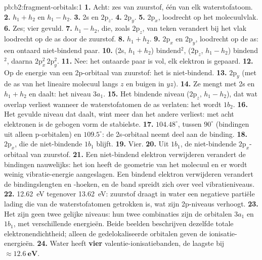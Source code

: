 \begin{solution}{pb:b2:fragment-orbitals:1}
\textbf{1.} Acht: zes van zuurstof, één van elk waterstofatoom.
\textbf{2.} $h_1 + h_2$ en $h_1 - h_2$.
\textbf{3.} 2s en $2\mathrm p_z$.
\textbf{4.} $2\mathrm p_y$.
\textbf{5.} $2\mathrm p_x$, loodrecht op het molecuulvlak.
\textbf{6.} Zes; vier gevuld.
\textbf{7.} $h_1 - h_2$, die, zoals $2\mathrm p_z$, van teken verandert bij het vlak
loodrecht op de as door de zuurstof.
\textbf{8.} $h_1 + h_2$.
\textbf{9.} $2\mathrm p_x$ en $2\mathrm p_y$, loodrecht op de as: een ontaard
niet-bindend paar.
\textbf{10.} (2s, $h_1 + h_2$) bindend$^2$, ($2\mathrm p_z$, $h_1 - h_2$) bindend$^2$, daarna
$2\mathrm p_x^2\,2\mathrm p_y^2$.
\textbf{11.} Nee: het ontaarde paar is vol, elk elektron is gepaard.
\textbf{12.} Op de energie van een 2p-orbitaal van zuurstof: het is niet-bindend.
\textbf{13.} $2\mathrm p_y$ (met de as van het lineaire molecuul langs $z$ en buigen in $yz$).
\textbf{14.} Ze mengt met 2s en $h_1 + h_2$ en daalt: het niveau $3a_1$.
\textbf{15.} Het bindende niveau ($2\mathrm p_z$, $h_1 - h_2$), dat wat overlap verliest wanneer de
waterstofatomen de as verlaten: het wordt $1b_2$.
\textbf{16.} Het gevulde niveau dat daalt, wint meer dan het andere verliest: met acht
elektronen is de gebogen vorm de stabielste.
\textbf{17.} $104.48^\circ$, tussen $90^\circ$ (bindingen uit alleen p-orbitalen) en $109.5^\circ$:
de 2s-orbitaal neemt deel aan de binding.
\textbf{18.} $2\mathrm p_x$, die de niet-bindende $1b_1$ blijft.
\textbf{19.} Vier.
\textbf{20.} Uit $1b_1$, de niet-bindende $2\mathrm p_x$-orbitaal van zuurstof.
\textbf{21.} Een niet-bindend elektron verwijderen verandert de bindingen nauwelijks: het ion heeft de
geometrie van het molecuul en er wordt weinig vibratie-energie aangeslagen. Een
bindend elektron verwijderen verandert de bindingslengten en -hoeken, en de band spreidt zich over
veel vibratieniveaus.
\textbf{22.} \qty{12.62}{eV} tegenover \qty{13.62}{eV}: zuurstof draagt in water een negatieve
partiële lading die van de waterstofatomen getrokken is, wat zijn 2p-niveaus verhoogt.
\textbf{23.} Het zijn geen twee gelijke niveaus: hun twee combinaties zijn de orbitalen $3a_1$ en
$1b_1$, met verschillende energieën. Beide beelden beschrijven dezelfde totale
elektronendichtheid; alleen de gedelokaliseerde orbitalen geven de ionisatie-energieën.
\textbf{24.} Water heeft \textbf{vier} valentie-ionisatiebanden, de laagste bij
$\boldsymbol{\approx \qty{12.6}{eV}}$.
\end{solution}
